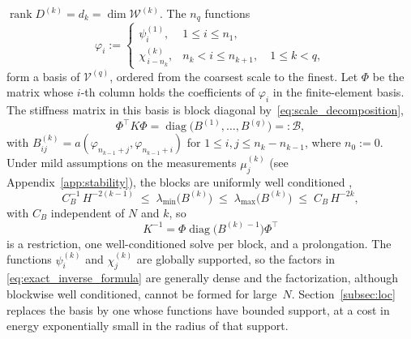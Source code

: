 \documentclass[hidelinks]{siamart}
\theoremstyle{nonumberplain}
\numberwithin{theorem}{section}
\begin{document}
$\operatorname{rank} D^{(k)} = d_k = \dim \mathcal{W}^{(k)}$.
The $n_q$ functions
\begin{equation}\label{eq:combined_basis}
  \varphi_i :=
  \begin{cases}
    \psi^{(1)}_i, & 1 \leq i \leq n_1, \\[2pt]
    \chi^{(k)}_{\,i - n_k}, & n_k < i \leq n_{k+1}, \quad 1 \leq k < q,
  \end{cases}
\end{equation}
form a basis of $\mathcal{V}^{(q)}$, ordered from the coarsest scale to
the finest.  Let $\Phi$ be the matrix whose $i$-th column holds the
coefficients of $\varphi_i$ in the finite-element basis.  The stiffness
matrix in this basis is block diagonal by~\eqref{eq:scale_decomposition},
\begin{equation}\label{eq:block_diagonal}
  \Phi^\top K \Phi = \operatorname{diag}\bigl(B^{(1)}, \ldots, B^{(q)}\bigr) =: \mathcal{B},
\end{equation}
with $B^{(k)}_{ij} = a(\varphi_{n_{k-1}+j}, \varphi_{n_{k-1}+i})$ for
$1 \leq i, j \leq n_k - n_{k-1}$, where $n_0 := 0$.  Under mild
assumptions on the measurements $\mu^{(k)}_j$ (see
Appendix~\ref{app:stability}), the blocks are uniformly well conditioned
\cite[Thm.~14.17]{Owhadi_Scovel_2019},
\begin{equation}\label{eq:block_conditioning}
  C_B^{-1}\, H^{-2(k-1)}
  \;\leq\; \lambda_{\min}\bigl(B^{(k)}\bigr)
  \;\leq\; \lambda_{\max}\bigl(B^{(k)}\bigr)
  \;\leq\; C_B\,H^{-2k},
\end{equation}
with $C_B$ independent of $N$ and $k$, so
\begin{equation}\label{eq:exact_inverse_formula}
  K^{-1} = \Phi \operatorname{diag}\bigl(B^{(k)\,-1}\bigr) \Phi^\top
\end{equation}
is a restriction, one well-conditioned solve per block, and a
prolongation.  The functions $\psi^{(k)}_i$ and $\chi^{(k)}_j$ are
globally supported, so the factors in
\eqref{eq:exact_inverse_formula} are generally dense and the factorization,
although blockwise well conditioned, cannot be formed for
large~$N$.  Section~\ref{subsec:loc} replaces the basis by one whose
functions have bounded support, at a cost in energy exponentially small
in the radius of that support.
\end{document}
